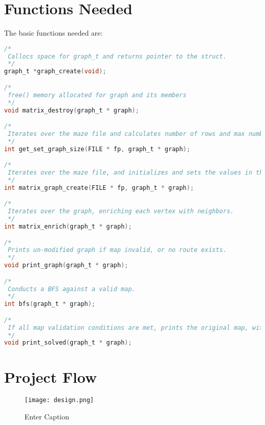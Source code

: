 \documentclass{article}
\begin{document}
\section{Functions Needed}
\noindent The basic functions needed are:
\begin{lstlisting}[language=C]
/*
 Callocs space for graph_t and returns pointer to the struct.
 */
graph_t *graph_create(void);

/*
 free() memory allocated for graph and its members
 */
void matrix_destroy(graph_t * graph);

/*
 Iterates over the maze file and calculates number of rows and max number of columns, setting graph.rows and graph.cols.
 */
int get_set_graph_size(FILE * fp, graph_t * graph);

/*
 Iterates over the maze file, and initializes and sets the values in the matrix based on location in the maze file. Sets vertex values, as well as confirms and denies presence of one and only one start and end point.
 */
int matrix_graph_create(FILE * fp, graph_t * graph);

/*
 Iterates over the graph, enriching each vertex with neighbors.
 */
int matrix_enrich(graph_t * graph);

/*
 Prints un-modified graph if map invalid, or no route exists.
 */
void print_graph(graph_t * graph);

/*
 Conducts a BFS against a valid map.
 */
int bfs(graph_t * graph);

/*
 If all map validation conditions are met, prints the original map, with route replaced by '.'.
 */
void print_solved(graph_t * graph);
\end{lstlisting}

\section{Project Flow}
\begin{figure}
    \centering
    \texttt{[image: design.png]}
    \caption{Enter Caption}
    \label{fig:enter-label}
\end{figure}
\end{document}
